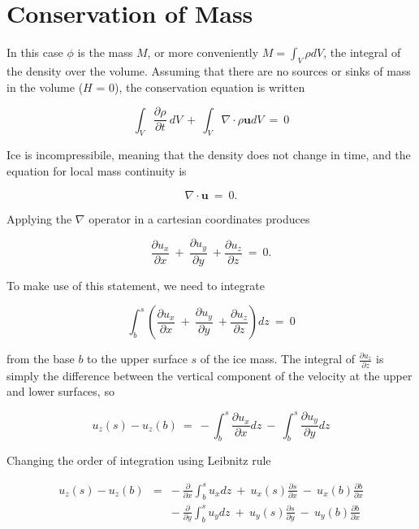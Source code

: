 \section{Conservation of Mass}


In this case $\phi$ is the mass $M$, or more conveniently
$M = \int_V \rho dV$, the integral of the density over the volume.
Assuming that there are no sources or sinks of mass in the volume ($H$ =
0), the conservation equation is written

\begin{equation}
\int_{V}\frac{\partial \rho} {\partial t} ~dV ~+~ \int_{V} \nabla \cdot \rho \mathbf{u} dV~=~0
\end{equation}

Ice is incompressibile, meaning that the density does not change in
time, and the equation for local mass continuity is

\begin{equation}
\nabla \cdot \mathbf{u} ~=~0.
\end{equation}

Applying the $\nabla$ operator in a cartesian coordinates produces

\begin{equation}
\frac{\partial u_{x}}{\partial x}~+~\frac{\partial u_{y}}{\partial y} ~+\frac{\partial u_{z}}{\partial z}~=~0.  
\end{equation}

To make use of this statement, we need to integrate

\begin{equation}
\int_{b}^{s} \left( \frac{\partial u_{x}}{\partial x}~+~\frac{\partial u_{y}}{\partial y} ~+\frac{\partial u_{z}}{\partial z}\right) dz~=~0  
\end{equation}

from the base $b$ to the upper surface $s$ of the ice mass. The integral
of $\frac{\partial u_z}{\partial z}$ is simply the difference between
the vertical component of the velocity at the upper and lower surfaces,
so

\begin{equation}
u_{z} \left(s\right)-u_{z} \left(b\right)~=~-\int_{b}^{s} \frac{\partial u_{x}}{\partial x} dz ~-~\int_{b}^{s} \frac{\partial u_{y}}{\partial y} dz  
\end{equation}

Changing the order of integration using Leibnitz rule

\begin{equation}
\begin{matrix}
u_{z} \left(s\right)-u_{z} \left(b\right) & = & -~\frac{\partial}{\partial x} \int_{b}^{s} u_{x} dz ~ +~u_{x}(s)\frac{\partial s}{\partial x} ~-~ u_{x}(b)\frac{\partial b}{\partial x}  \\ 
& & -~\frac{\partial}{\partial y}\int_{b}^{s} u_{y} dz   ~ +~u_{y}(s)\frac{\partial s}{\partial y} ~-~ u_{y}(b)\frac{\partial b}{\partial x}
\end{matrix}
\end{equation}

